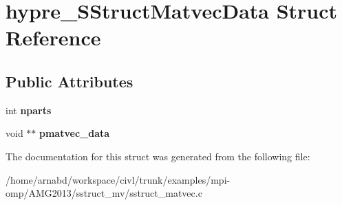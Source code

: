 \hypertarget{structhypre__SStructMatvecData}{}\section{hypre\+\_\+\+S\+Struct\+Matvec\+Data Struct Reference}
\label{structhypre__SStructMatvecData}
\subsection*{Public Attributes}
\begin{DoxyCompactItemize}
\item 
\hypertarget{structhypre__SStructMatvecData_a0c532b4ca5432665217219354b370752}{}int {\bfseries nparts}\label{structhypre__SStructMatvecData_a0c532b4ca5432665217219354b370752}

\item 
\hypertarget{structhypre__SStructMatvecData_a4051c256bf858b90f5e21f1749862a8e}{}void $\ast$$\ast$ {\bfseries pmatvec\+\_\+data}\label{structhypre__SStructMatvecData_a4051c256bf858b90f5e21f1749862a8e}

\end{DoxyCompactItemize}


The documentation for this struct was generated from the following file\+:\begin{DoxyCompactItemize}
\item 
/home/arnabd/workspace/civl/trunk/examples/mpi-\/omp/\+A\+M\+G2013/sstruct\+\_\+mv/sstruct\+\_\+matvec.\+c\end{DoxyCompactItemize}
